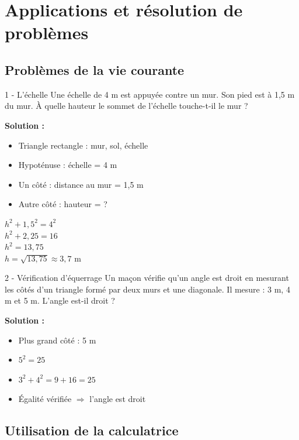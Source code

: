 \section{Applications et résolution de problèmes}

\subsection{Problèmes de la vie courante}

\begin{exercisebox}{1 - L'échelle}
Une échelle de 4 m est appuyée contre un mur. Son pied est à 1,5 m du mur. À quelle hauteur le sommet de l'échelle touche-t-il le mur ?

\textbf{Solution :}
\begin{itemize}
    \item Triangle rectangle : mur, sol, échelle
    \item Hypoténuse : échelle = 4 m
    \item Un côté : distance au mur = 1,5 m
    \item Autre côté : hauteur = ?
\end{itemize}

$h^2 + 1,5^2 = 4^2$\\
$h^2 + 2,25 = 16$\\
$h^2 = 13,75$\\
$h = \sqrt{13,75} \approx 3,7$ m
\end{exercisebox}

\begin{exercisebox}{2 - Vérification d'équerrage}
Un maçon vérifie qu'un angle est droit en mesurant les côtés d'un triangle formé par deux murs et une diagonale. Il mesure : 3 m, 4 m et 5 m. L'angle est-il droit ?

\textbf{Solution :}
\begin{itemize}
    \item Plus grand côté : 5 m
    \item $5^2 = 25$
    \item $3^2 + 4^2 = 9 + 16 = 25$
    \item Égalité vérifiée $\Rightarrow$ l'angle est droit
\end{itemize}
\end{exercisebox}

\subsection{Utilisation de la calculatrice}


